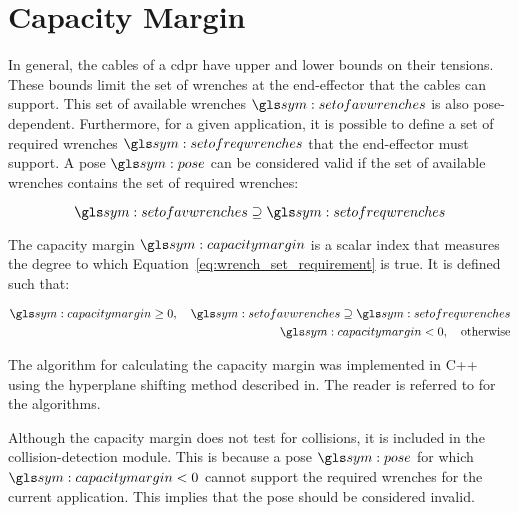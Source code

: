 \section{Capacity Margin}%
\label{sec:capacity_margin}

	In general, the cables of a \gls{cdpr} have upper and lower bounds on their
	tensions. These bounds limit the set of wrenches at the end-effector that
	the cables can support. This set of available wrenches $\setofavwrenches$ is
	also pose-dependent. Furthermore, for a given application, it is possible to
	define a set of required wrenches $\setofreqwrenches$ that the end-effector
	must support. A pose $\pose$ can be considered valid if the set of available
	wrenches contains the set of required wrenches:

	\begin{equation}
		\setofavwrenches \supseteq \setofreqwrenches
		\label{eq:wrench_set_requirement}
	\end{equation}

	The capacity margin $\capacitymargin$  is a scalar
	index that measures the degree to which
	Equation~\ref{eq:wrench_set_requirement} is true. It is defined such that:

	\begin{align}
		\begin{split}
			\capacitymargin \geq 0, \quad \setofavwrenches \supseteq \setofreqwrenches \\
			\capacitymargin < 0, \quad \text{otherwise}
		\end{split}
	\end{align}

	The algorithm for calculating the capacity margin was implemented in C++
	using the hyperplane shifting method described in. The reader is referred to  for the
	algorithms.

	Although the capacity margin does not test for collisions, it is included in
	the collision-detection module. This is because a pose $\pose$ for which
	$\capacitymargin < 0$ cannot support the required wrenches for the current
	application. This implies that the pose should be considered invalid.


